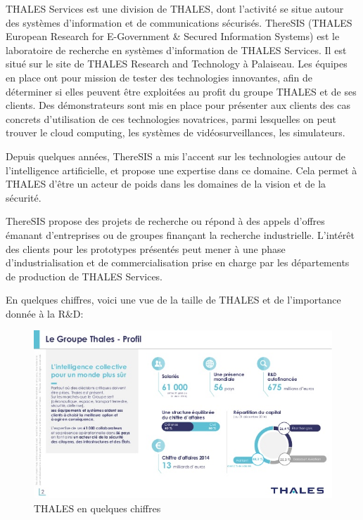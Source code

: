THALES Services est une division de THALES, dont l’activité se situe autour des
systèmes d’information et de communications sécurisés.
ThereSIS (THALES European Research for E-Government & Secured Information
Systems) est le laboratoire de recherche en systèmes d’information de THALES
Services. Il est situé sur le site de THALES Research and Technology à Palaiseau.
Les équipes en place ont pour mission de tester des technologies
innovantes, afin de déterminer si elles peuvent être exploitées au profit du
groupe THALES et de ses clients. Des démonstrateurs sont mis en place pour
présenter aux clients des cas concrets d’utilisation de ces technologies
novatrices, parmi lesquelles on peut trouver le cloud computing, les systèmes de
vidéosurveillances, les simulateurs.

Depuis quelques années, ThereSIS a mis l'accent sur les technologies autour de l'intelligence artificielle, et propose une expertise dans ce domaine. Cela permet à THALES d'être un acteur de poids dans les domaines de la vision et de la sécurité.

ThereSIS propose des projets de recherche ou répond à des appels d’offres
émanant d’entreprises ou de groupes finançant la recherche industrielle. L’intérêt
des clients pour les prototypes présentés peut mener à une phase
d’industrialisation et de commercialisation prise en charge par les départements
de production de THALES Services.

\bigskip
En quelques chiffres, voici une vue de la taille de THALES et de l'importance donnée à la R&D: 
\bigskip
\begin{figure}[!h]
\centering
\includegraphics[width=.9\linewidth]{./assets/thales_chiffres}
\caption{THALES en quelques chiffres}
\medskip
\small
\end{figure}